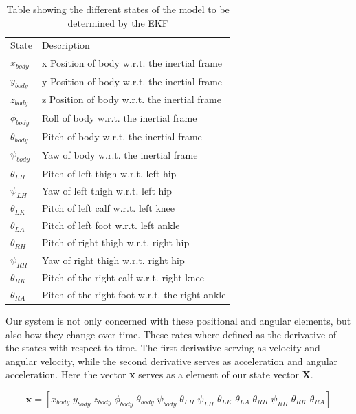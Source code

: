 \begin{table}[!ht]
\captionsetup{width=0.8\linewidth, font=small}  
\centering
\label{statesForEkf}
\begin{tabular}{ll}
State & Description \\
$x_{body}$  	&x Position of body w.r.t. the inertial frame\\
$y_{body}$     &y Position of body w.r.t. the inertial frame\\
$z_{body}$     &z Position of body w.r.t. the inertial frame\\
$\phi_{body}$      &Roll of body w.r.t. the inertial frame\\
$\theta_{body}$    &Pitch of body w.r.t. the inertial frame\\
$\psi_{body}$      &Yaw of body w.r.t. the inertial frame\\
$\theta_{LH}$     &Pitch of left thigh w.r.t. left hip\\
$\psi_{LH}$      &Yaw of left thigh w.r.t. left hip\\
$\theta_{LK}$    &Pitch of left calf w.r.t. left knee\\
$\theta_{LA}$   &Pitch of left foot w.r.t. left ankle\\
$\theta_{RH}$    &Pitch of right thigh w.r.t. right hip\\
$\psi_{RH}$      &Yaw of right thigh w.r.t. right hip\\
$\theta_{RK}$   &Pitch of the right calf w.r.t. right knee\\
$\theta_{RA}$  &Pitch of the right foot w.r.t. the right ankle\\
\end{tabular}
\caption{Table showing the different states of the model to be determined by the EKF}
\end{table}

\newpage
Our system is not only concerned with these positional and angular elements, but also how they change over time. These rates where defined as the derivative of the states with respect to time. The first derivative serving as velocity and angular velocity, while the second derivative serves as acceleration and angular acceleration. Here the vector \textbf{x} serves as a element of our state vector \textbf{X}.

$$\textbf{x} = [ x_{body} \; y_{body} \; z_{body} \; \phi_{body} \;    		    \theta_{body}  \; \psi_{body}\;  \theta_{LH}\; \psi_{LH}   \;\theta_{LK} 	\;\theta_{LA} 	\;\theta_{RH} \;\psi_{RH}   	\;\theta_{RK}   \; \theta_{RA}  		]$$ 


